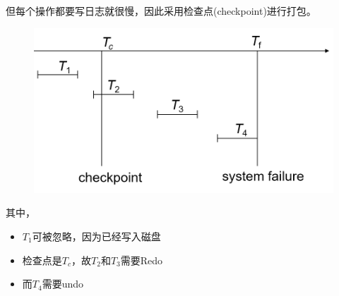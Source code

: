但每个操作都要写日志就很慢，因此采用检查点(checkpoint)进行打包。
\begin{figure}[H]
\centering
\includegraphics[width=0.6\linewidth]{fig/checkpoints_eg.png}
\end{figure}
其中，
\begin{itemize}
	\item $T_1$可被忽略，因为已经写入磁盘
	\item 检查点是$T_c$，故$T_2$和$T_3$需要Redo
	\item 而$T_4$需要undo
\end{itemize}